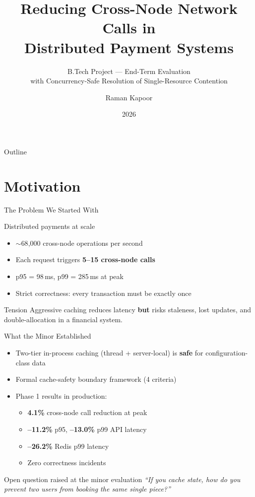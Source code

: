 \documentclass[aspectratio=169, 11pt]{beamer}
\title[BTP End-Term]{Reducing Cross-Node Network Calls in\\Distributed Payment Systems}
\subtitle{B.Tech Project --- End-Term Evaluation\\\small with Concurrency-Safe Resolution of Single-Resource Contention}
\author[Raman Kapoor]{Raman Kapoor}
\institute[ABV-IIITM]{ABV --- Indian Institute of Information Technology\\and Management, Gwalior\\[0.5em]\textbf{Supervisor:} Dr.\ Rahul Kala}
\date{2026}
\begin{document}
{
\begin{frame}
\titlepage
\end{frame}
}

\begin{frame}{Outline}
\tableofcontents
\end{frame}

\section{Motivation}

\begin{frame}{The Problem We Started With}
\begin{block}{Distributed payments at scale}
\begin{itemize}
    \item $\sim$68{,}000 cross-node operations per second
    \item Each request triggers \textbf{5--15 cross-node calls}
    \item p95 = 98\,ms, p99 = 285\,ms at peak
    \item Strict correctness: every transaction must be exactly once
\end{itemize}
\end{block}
\pause
\begin{alertblock}{Tension}
Aggressive caching reduces latency \textbf{but} risks staleness, lost updates, and double-allocation in a financial system.
\end{alertblock}
\end{frame}

\begin{frame}{What the Minor Established}
\begin{itemize}
    \item Two-tier in-process caching (thread + server-local) is \textbf{safe} for configuration-class data
    \item Formal cache-safety boundary framework (4 criteria)
    \item Phase 1 results in production:
    \begin{itemize}
        \item \textbf{4.1\%} cross-node call reduction at peak
        \item \textbf{--11.2\%} p95, \textbf{--13.0\%} p99 API latency
        \item \textbf{--26.2\%} Redis p99 latency
        \item Zero correctness incidents
    \end{itemize}
\end{itemize}
\pause
\begin{alertblock}{Open question raised at the minor evaluation}
\centering
\emph{``If you cache state, how do you prevent two users from booking the same single piece?''}
\end{alertblock}
\end{frame}
\end{document}

